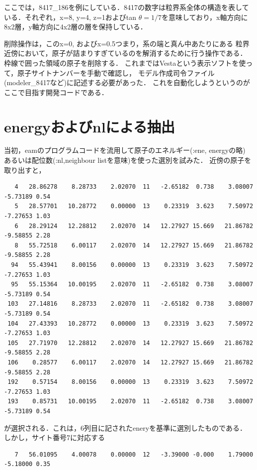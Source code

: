 ここでは，8417\_186を例にしている．8417の数字は粒界系全体の構造を表している．それぞれ，x=8,
y=4, z=1およびtan
\(\theta=1/7\)を意味しており，x軸方向に8x2層，y軸方向に4x2層の層を保持している．

削除操作は，このx=0, およびx=0.5つまり，系の端と真ん中あたりにある
粒界近傍において，原子が詰まりすぎているのを解消するために行う操作である．
枠線で囲った領域の原子を削除する．
これまではVestaという表示ソフトを使って，原子サイトナンバーを手動で確認し，
モデル作成司令ファイル(modeler\_8417など)に記述する必要があった．
これを自動化しようというのがここで目指す開発コードである．

    \section{energyおよびnlによる抽出}\label{energyux304aux3088ux3073nlux306bux3088ux308bux62bdux51fa}

    当初，eamのプログラムコードを流用して原子のエネルギー(:ene, energyの略)
あるいは配位数(:nl,neighbour listを意味)を使った選別を試みた．
近傍の原子を取り出すと，

\begin{verbatim}
   4   28.86278    8.28733    2.02070  11   -2.65182  0.738    3.08007   -5.73189 0.54
   5   28.57701   10.28772    0.00000  13    0.23319  3.623    7.50972   -7.27653 1.03
   6   28.29124   12.28812    2.02070  14   12.27927 15.669   21.86782   -9.58855 2.28
   8   55.72518    6.00117    2.02070  14   12.27927 15.669   21.86782   -9.58855 2.28
  94   55.43941    8.00156    0.00000  13    0.23319  3.623    7.50972   -7.27653 1.03
  95   55.15364   10.00195    2.02070  11   -2.65182  0.738    3.08007   -5.73189 0.54
 103   27.14816    8.28733    2.02070  11   -2.65182  0.738    3.08007   -5.73189 0.54
 104   27.43393   10.28772    0.00000  13    0.23319  3.623    7.50972   -7.27653 1.03
 105   27.71970   12.28812    2.02070  14   12.27927 15.669   21.86782   -9.58855 2.28
 106    0.28577    6.00117    2.02070  14   12.27927 15.669   21.86782   -9.58855 2.28
 192    0.57154    8.00156    0.00000  13    0.23319  3.623    7.50972   -7.27653 1.03
 193    0.85731   10.00195    2.02070  11   -2.65182  0.738    3.08007   -5.73189 0.54
\end{verbatim}

が選択される．これは，6列目に記されたeneryを基準に選別したものである．
しかし，サイト番号7に対応する

\begin{verbatim}
   7   56.01095    4.00078    0.00000  12   -3.39000 -0.000    1.79000   -5.18000 0.35
\end{verbatim}

